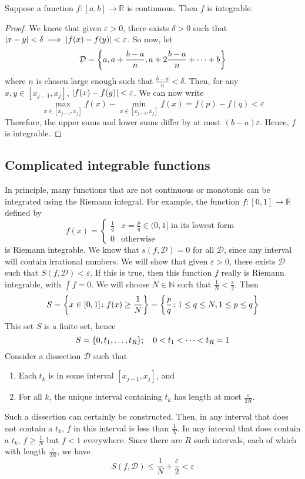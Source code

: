 \begin{theorem}
	Suppose a function \(f \colon [a, b] \to \mathbb R\) is continuous.
	Then \(f\) is integrable.
\end{theorem}
\begin{proof}
	We know that given \(\varepsilon > 0\), there exists \(\delta > 0\) such that \(\abs{x - y} < \delta \implies \abs{f(x) - f(y)} < \varepsilon\).
	So now, let
	\[
		\mathcal D = \qty{ a, a + \frac{b-a}{n}, a + 2\frac{b-a}{n} + \dots + b }
	\]
	where \(n\) is chosen large enough such that \(\frac{b-a}{n} < \delta\).
	Then, for any \(x, y \in [x_{j-1}, x_j]\), \(\abs{f(x) - f(y)} < \varepsilon\).
	We can now write
	\[
		\max_{x \in [x_{j-1}, x_j]} f(x) - \min_{x \in [x_{j-1}, x_j]} f(x) = f(p) - f(q) < \varepsilon
	\]
	Therefore, the upper sums and lower sums differ by at most \((b-a)\varepsilon\).
	Hence, \(f\) is integrable.
\end{proof}

\subsection{Complicated integrable functions}
In principle, many functions that are not continuous or monotonic can be integrated using the Riemann integral.
For example, the function \(f\colon [0, 1] \to \mathbb R\) defined by
\[
	f(x) = \begin{cases}
		\frac{1}{q} & x = \frac{p}{q} \in (0, 1] \text{ in its lowest form } \\
		0           & \text{otherwise}
	\end{cases}
\]
is Riemann integrable.
We know that \(s(f, \mathcal D) = 0\) for all \(\mathcal D\), since any interval will contain irrational numbers.
We will show that given \(\varepsilon > 0\), there exists \(\mathcal D\) such that \(S(f, \mathcal D) < \varepsilon\).
If this is true, then this function \(f\) really is Riemann integrable, with \(\int f = 0\).
We will choose \(N \in \mathbb N\) such that \(\frac{1}{N} < \frac{\varepsilon}{2}\).
Then
\[
	S = \qty{ x \in [0, 1] \colon f(x) \geq \frac{1}{N} } = \qty{ \frac{p}{q} \colon 1 \leq q \leq N, 1 \leq p \leq q }
\]
This set \(S\) is a finite set, hence
\[
	S = \qty{ 0, t_1, \dots, t_R };\quad 0 < t_1 < \dots < t_R = 1
\]
Consider a dissection \(\mathcal D\) such that
\begin{enumerate}[(1)]
	\item Each \(t_k\) is in some interval \([x_{j-1}, x_j]\), and
	\item For all \(k\), the unique interval containing \(t_k\) has length at most \(\frac{\varepsilon}{2R}\).
\end{enumerate}
Such a dissection can certainly be constructed.
Then, in any interval that does not contain a \(t_k\), \(f\) in this interval is less than \(\frac{1}{N}\).
In any interval that does contain a \(t_k\), \(f \geq \frac{1}{N}\) but \(f < 1\) everywhere.
Since there are \(R\) such intervals, each of which with length \(\frac{\varepsilon}{2R}\), we have
\[
	S(f, \mathcal D) \leq \frac{1}{N} + \frac{\varepsilon}{2} < \varepsilon
\]

